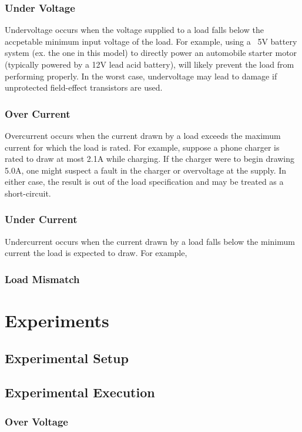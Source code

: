 \documentclass[11pt,conference,draftcls,onecolumn]{IEEEtran}
\begin{document}
\subsubsection{Under Voltage}
Undervoltage occurs when the voltage supplied to a load falls below the accpetable minimum input voltage of the load.
For example, using a ~5V battery system (ex. the one in this model) to directly power an automobile starter motor (typically powered by a 12V lead acid battery), will likely prevent the load from performing properly.
In the worst case, undervoltage may lead to damage if unprotected field-effect transistors are used.

\subsubsection{Over Current}
Overcurrent occurs when the current drawn by a load exceeds the maximum current for which the load is rated.
For example, suppose a phone charger is rated to draw at most 2.1A while charging.
If the charger were to begin drawing 5.0A, one might suspect a fault in the charger or overvoltage at the supply.
In either case, the result is out of the load specification and may be treated as a short-circuit.

\subsubsection{Under Current}
Undercurrent occurs when the current drawn by a load falls below the minimum current the load is expected to draw.
For example, 

\subsubsection{Load Mismatch}

\section{Experiments}\label{sec:experiments}
\subsection{Experimental Setup}
\subsection{Experimental Execution}
\subsubsection{Over Voltage}
\end{document}
